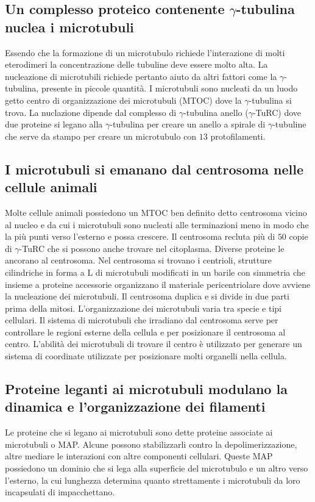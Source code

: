 \subsection{Un complesso proteico contenente $\gamma$-tubulina nuclea i microtubuli}
Essendo che la formazione di un microtubulo richiede l'interazione di molti eterodimeri la concentrazione delle tubuline deve essere molto alta. La nucleazione di microtubili richiede
pertanto aiuto da altri fattori come la $\gamma$-tubulina, presente in piccole quantit\`a. I microtubuli sono nucleati da un luodo getto centro di organizzazione dei microtubuli (MTOC)
dove la $\gamma$-tubulina si trova. La nuclazione dipende dal complesso di $\gamma$-tubulina anello ($\gamma$-TuRC) dove due proteine si legano alla $\gamma$-tubulina per creare
un anello a spirale di $\gamma$-tubuline che serve da stampo per creare un microtubulo con $13$ protofilamenti.
\subsection{I microtubuli si emanano dal centrosoma nelle cellule animali}
Molte cellule animali possiedono un MTOC ben definito detto centrosoma vicino al nucleo e da cui i microtubuli sono nucleati alle terminazioni meno in modo che la pi\`u punti verso
l'esterno e possa crescere. Il centrosoma recluta pi\`u di $50$ copie di $\gamma$-TuRC che si possono anche trovare nel citoplasma. Diverse proteine le ancorano al centrosoma. Nel 
centrosoma si trovano i centrioli, strutture cilindriche in forma a L di microtubuli modificati in un barile con simmetria che insieme a proteine accessorie organizzano il materiale
pericentriolare dove avviene la nucleazione dei microtubuli. Il centrosoma duplica e si divide in due parti prima della mitosi. L'organizzazione dei microtubuli varia tra specie e tipi
cellulari. Il sistema di microtubuli che irradiano dal centrosoma serve per controllare le regioni esterne della cellula e per posizionare il centrosoma al centro. L'abilit\`a dei
microtubuli di trovare il centro \`e utilizzato per generare un sistema di coordinate utilizzate per posizionare molti organelli nella cellula. 
\subsection{Proteine leganti ai microtubuli modulano la dinamica e l'organizzazione dei filamenti}
Le proteine che si legano ai microtubuli sono dette proteine associate ai microtubuli o MAP. Alcune possono stabilizzarli contro la depolimerizzazione, altre mediare le interazioni con
altre componenti cellulari. Queste MAP possiedono un dominio che si lega alla superficie del microtubulo e un altro verso l'esterno, la cui lunghezza determina quanto strettamente i 
microtubuli da loro incapsulati di impacchettano.
